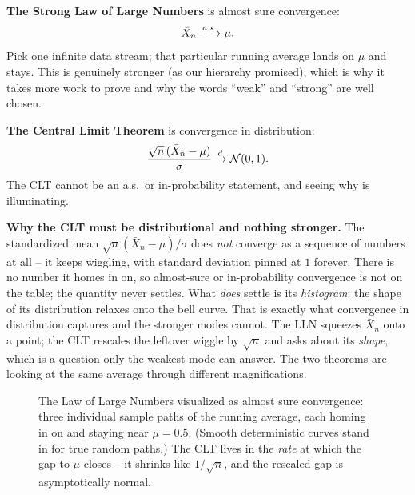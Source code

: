 \textbf{The Strong Law of Large Numbers} is almost sure convergence:
\[
  \bar X_n \xrightarrow{a.s.} \mu.
\]
Pick one infinite data stream; that particular running average lands on $\mu$ and
stays. This is genuinely stronger (as our hierarchy promised), which is why it takes
more work to prove and why the words ``weak'' and ``strong'' are well chosen.

\textbf{The Central Limit Theorem} is convergence in distribution:
\[
  \frac{\sqrt n\,(\bar X_n - \mu)}{\sigma} \xrightarrow{d} \mathcal{N}(0,1).
\]
The CLT cannot be an a.s.\ or in-probability statement, and seeing why is illuminating.

\begin{happeningbox}
\textbf{Why the CLT must be distributional and nothing stronger.} The standardized
mean $\sqrt n(\bar X_n-\mu)/\sigma$ does \emph{not} converge as a sequence of numbers
at all -- it keeps wiggling, with standard deviation pinned at $1$ forever. There is
no number it homes in on, so almost-sure or in-probability convergence is not on
the table; the quantity never settles. What \emph{does} settle is its \emph{histogram}:
the shape of its distribution relaxes onto the bell curve. That is exactly what
convergence in distribution captures and the stronger modes cannot. The LLN squeezes
$\bar X_n$ onto a point; the CLT rescales the leftover wiggle by $\sqrt n$ and asks
about its \emph{shape}, which is a question only the weakest mode can answer. The two
theorems are looking at the same average through different magnifications.
\end{happeningbox}

\begin{figure}[H]
\centering
{}
\caption{The Law of Large Numbers visualized as almost sure convergence: three
individual sample paths of the running average, each homing in on and staying near
$\mu=0.5$. (Smooth deterministic curves stand in for true random paths.) The CLT lives
in the \emph{rate} at which the gap to $\mu$ closes -- it shrinks like $1/\sqrt n$, and
the rescaled gap is asymptotically normal.}
\label{ch22:fig-lln-paths}
\end{figure}

